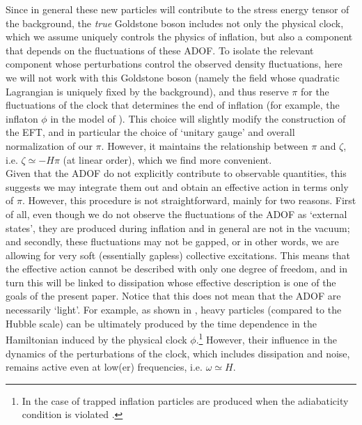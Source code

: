 \documentclass[11pt,amsmath,floats,floatfix,nofootinbib,secnumarabic, superscriptaddress, tightenlines]{revtex4}
\begin{document}
Since in general these new particles will contribute to the stress energy tensor of the background, the {\it true} Goldstone boson includes not only the physical clock, which we assume uniquely controls the physics of inflation, but also a component that depends on the fluctuations of these ADOF. To isolate the relevant component whose perturbations control the observed density fluctuations, here we will not work with this Goldstone boson (namely the field whose quadratic Lagrangian is uniquely fixed by the background), and thus reserve $\pi$ for the fluctuations of the clock that determines the end of inflation (for example, the inflaton $\phi$ in the model of \cite{trapped}). This choice will slightly modify the construction of the EFT, and in particular the choice of `unitary gauge' and overall normalization of our $\pi$. However, it maintains the relationship between $\pi$ and $\zeta$, i.e. $\zeta \simeq -H\pi$ (at linear order), which we find more convenient.\\

Given that the ADOF do not explicitly contribute to observable quantities, this suggests we may integrate them out and obtain an effective action in terms only of $\pi$. However, this procedure is not straightforward, mainly for two reasons. First of all, even though we do not observe the fluctuations of the ADOF as `external states', they are produced during inflation and in general are not in the vacuum; and secondly, these fluctuations may not be gapped, or in other words, we are allowing for very soft (essentially gapless) collective excitations. This means that the effective action cannot be described with only one degree of freedom, and in turn this will be linked to dissipation whose effective description is one of the goals of the present paper.  Notice that this does not mean that the ADOF are necessarily `light'. For example,  as shown in \cite{trapped}, heavy particles (compared to the Hubble scale) can be ultimately produced by the time dependence in the Hamiltonian induced by the physical clock $\phi$.\footnote{In the case of trapped inflation particles are produced when the adiabaticity condition is violated \cite{beauty,trapped}.} However, their influence in the dynamics of the perturbations of the clock, which includes dissipation and noise, remains active even at low(er) frequencies, i.e. $\omega \simeq H$.\\
\end{document}

